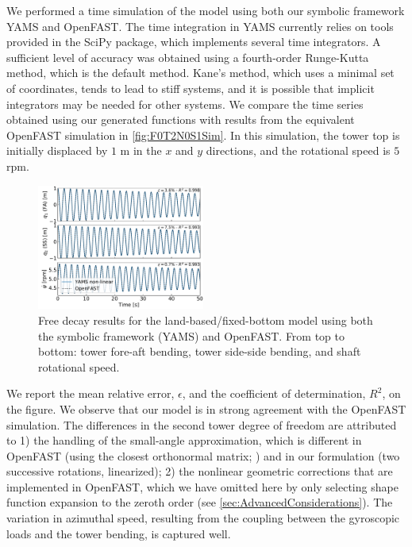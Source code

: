 \documentclass[wes, manuscript]{copernicus}
\begin{document}
We performed a time simulation of the model using both our symbolic framework YAMS and OpenFAST.
The time integration in YAMS currently relies on tools provided in the SciPy package, which implements several time integrators.
A sufficient level of accuracy was obtained using a fourth-order Runge-Kutta method, which is the default method.
Kane's method, which uses a minimal set of coordinates, tends to lead to stiff systems, and it is possible that implicit integrators may be needed for other systems.
We compare the time series obtained using our generated functions with results from the equivalent OpenFAST simulation in \autoref{fig:F0T2N0S1Sim}.
In this simulation, the tower top is initially displaced by $1$ \unit{m} in the $x$ and $y$ directions, and the rotational speed is $5$ \unit{rpm}.
\noindent\begin{figure}[!htb]\centering%
  \includegraphics[width=0.49\textwidth]{figs/F0T2N0S1Sim}
  \caption{Free decay results for the land-based/fixed-bottom model using both the symbolic framework (YAMS) and OpenFAST. From top to bottom: tower fore-aft bending, tower side-side bending, and shaft rotational speed.}\label{fig:F0T2N0S1Sim}%
\end{figure}
We report the mean relative error, $\epsilon$, and the coefficient of determination, $R^2$, on the figure.
We observe that our model is in strong agreement with the OpenFAST simulation.
The differences in the second tower degree of freedom are attributed to 1) the handling of the small-angle approximation, which is different in OpenFAST (using the closest orthonormal matrix; \cite{Jonkman:2009}) and in our formulation (two successive rotations, linearized); 2) the nonlinear geometric corrections that are implemented in OpenFAST, which we have omitted here by only selecting shape function expansion to the zeroth order (see \autoref{sec:AdvancedConsiderations}). 
The variation in azimuthal speed, resulting from the coupling between the gyroscopic loads and the tower bending, is captured well. 
\end{document}

